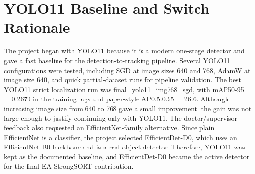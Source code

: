 \documentclass[12pt,a4paper]{report}
\begin{document}
\section{YOLO11 Baseline and Switch Rationale}
The project began with YOLO11 because it is a modern one-stage detector and gave a fast baseline for the detection-to-tracking pipeline. Several YOLO11 configurations were tested, including SGD at image sizes 640 and 768, AdamW at image size 640, and quick partial-dataset runs for pipeline validation. The best YOLO11 strict localization run was final\_yolo11\_img768\_sgd, with mAP50-95 = 0.2670 in the training logs and paper-style AP0.5:0.95 = 26.6. Although increasing image size from 640 to 768 gave a small improvement, the gain was not large enough to justify continuing only with YOLO11. The doctor/supervisor feedback also requested an EfficientNet-family alternative. Since plain EfficientNet is a classifier, the project selected EfficientDet-D0, which uses an EfficientNet-B0 backbone and is a real object detector. Therefore, YOLO11 was kept as the documented baseline, and EfficientDet-D0 became the active detector for the final EA-StrongSORT contribution.
\begin{table}[H]
\centering
\small
{}
\caption{YOLO11 hyperparameter experiments before switching detector family.}
\label{tab:yolo_tuning}
\end{table}
\end{document}
